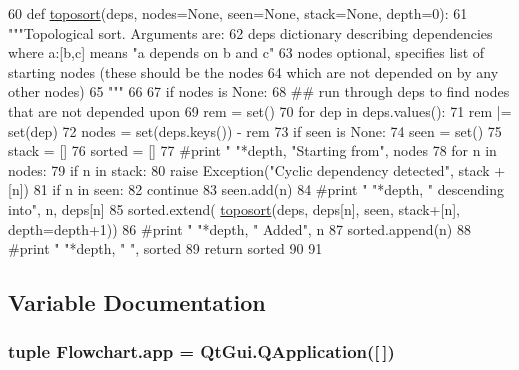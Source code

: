 \begin{DoxyCode}
60 \textcolor{keyword}{def }\hyperlink{namespaceFlowchart_a3a8dec1a56afa0fb5e704625606501b6}{toposort}(deps, nodes=None, seen=None, stack=None, depth=0):
61     \textcolor{stringliteral}{"""Topological sort. Arguments are:}
62 \textcolor{stringliteral}{      deps    dictionary describing dependencies where a:[b,c] means "a depends on b and c"}
63 \textcolor{stringliteral}{      nodes   optional, specifies list of starting nodes (these should be the nodes }
64 \textcolor{stringliteral}{              which are not depended on by any other nodes) }
65 \textcolor{stringliteral}{    """}
66     
67     \textcolor{keywordflow}{if} nodes \textcolor{keywordflow}{is} \textcolor{keywordtype}{None}:
68         \textcolor{comment}{## run through deps to find nodes that are not depended upon}
69         rem = set()
70         \textcolor{keywordflow}{for} dep \textcolor{keywordflow}{in} deps.values():
71             rem |= set(dep)
72         nodes = set(deps.keys()) - rem
73     \textcolor{keywordflow}{if} seen \textcolor{keywordflow}{is} \textcolor{keywordtype}{None}:
74         seen = set()
75         stack = []
76     sorted = []
77     \textcolor{comment}{#print "  "*depth, "Starting from", nodes}
78     \textcolor{keywordflow}{for} n \textcolor{keywordflow}{in} nodes:
79         \textcolor{keywordflow}{if} n \textcolor{keywordflow}{in} stack:
80             \textcolor{keywordflow}{raise} Exception(\textcolor{stringliteral}{"Cyclic dependency detected"}, stack + [n])
81         \textcolor{keywordflow}{if} n \textcolor{keywordflow}{in} seen:
82             \textcolor{keywordflow}{continue}
83         seen.add(n)
84         \textcolor{comment}{#print "  "*depth, "  descending into", n, deps[n]}
85         sorted.extend( \hyperlink{namespaceFlowchart_a3a8dec1a56afa0fb5e704625606501b6}{toposort}(deps, deps[n], seen, stack+[n], depth=depth+1))
86         \textcolor{comment}{#print "  "*depth, "  Added", n}
87         sorted.append(n)
88         \textcolor{comment}{#print "  "*depth, "  ", sorted}
89     \textcolor{keywordflow}{return} sorted
90         
91 
\end{DoxyCode}


\subsection{Variable Documentation}
\hypertarget{namespaceFlowchart_a1341dbc8fc4a0b646c19b56f288e03bd}{}
\subsubsection[{app}]{\setlength{\rightskip}{0pt plus 5cm}tuple Flowchart.\+app = Qt\+Gui.\+Q\+Application(\mbox{[}$\,$\mbox{]})}\label{namespaceFlowchart_a1341dbc8fc4a0b646c19b56f288e03bd}
\hypertarget{namespaceFlowchart_a8c7765a75e5c267970b7a075876dd703}{}
